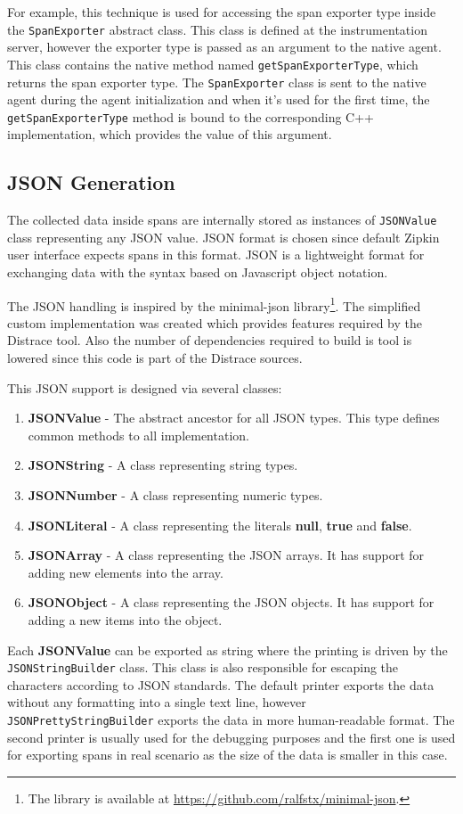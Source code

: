For example, this technique is used for accessing the span exporter type inside the \texttt{SpanExporter} abstract class. This class is defined at the instrumentation server, however the exporter type is passed as an argument to the native agent. This class contains the native method named \texttt{getSpanExporterType}, which returns the span exporter type. The \texttt{SpanExporter} class is sent to the native agent during the agent initialization and when it's used for the first time, the \texttt{getSpanExporterType} method is bound to the corresponding C++ implementation, which provides the value of this argument.

\subsection{JSON Generation}
\label{json_gen}

The collected data inside spans are internally stored as instances of \texttt{JSONValue} class representing any JSON value. JSON format is chosen since default Zipkin user interface expects spans in this format. JSON is a lightweight format for exchanging data with the syntax based on Javascript object notation.

The JSON handling is inspired by the minimal-json library\footnote{The library is available at \url{https://github.com/ralfstx/minimal-json}.}. The simplified custom implementation was created which provides features required by the Distrace tool. Also the number of dependencies required to build is tool is lowered since this code is part of the Distrace sources.

This JSON support is designed via several classes:
\begin{enumerate}
	\item \textbf{JSONValue} - The abstract ancestor for all JSON types. This type defines common methods to all implementation.
	\item \textbf{JSONString} - A class representing string types.
	\item \textbf{JSONNumber} - A class representing numeric types.
	\item \textbf{JSONLiteral} - A class representing the literals \textbf{null}, \textbf{true} and \textbf{false}.
	\item \textbf{JSONArray} - A class representing the JSON arrays. It has support for adding new elements into the array.
	\item \textbf{JSONObject} - A class representing the JSON objects. It has support for adding a new items into the object.
\end{enumerate}

Each \textbf{JSONValue} can be exported as string where the printing is driven by the \texttt{JSONStringBuilder} class. This class is also responsible for escaping the characters according to JSON standards. The default printer exports the data without any formatting into a single text line, however \texttt{JSONPrettyStringBuilder} exports the data in more human-readable format. The second printer is usually used for the debugging purposes and the first one is used for exporting spans in real scenario as the size of the data is smaller in this case.


